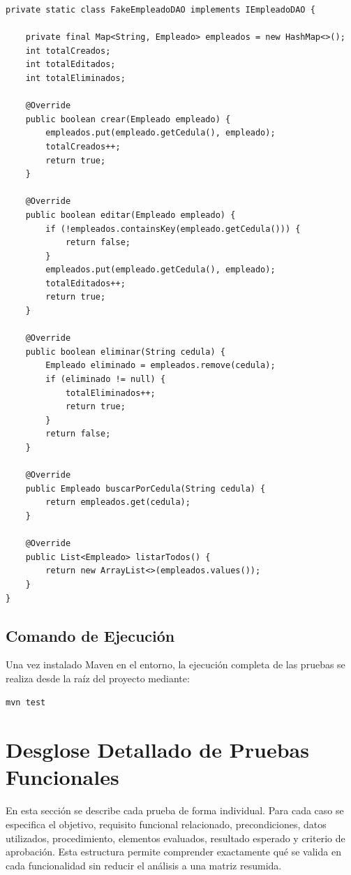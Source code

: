 \documentclass[12pt,a4paper]{article}
\begin{document}
\begin{lstlisting}[style=javaStyle, caption={DAO en memoria para empleados}]
private static class FakeEmpleadoDAO implements IEmpleadoDAO {

    private final Map<String, Empleado> empleados = new HashMap<>();
    int totalCreados;
    int totalEditados;
    int totalEliminados;

    @Override
    public boolean crear(Empleado empleado) {
        empleados.put(empleado.getCedula(), empleado);
        totalCreados++;
        return true;
    }

    @Override
    public boolean editar(Empleado empleado) {
        if (!empleados.containsKey(empleado.getCedula())) {
            return false;
        }
        empleados.put(empleado.getCedula(), empleado);
        totalEditados++;
        return true;
    }

    @Override
    public boolean eliminar(String cedula) {
        Empleado eliminado = empleados.remove(cedula);
        if (eliminado != null) {
            totalEliminados++;
            return true;
        }
        return false;
    }

    @Override
    public Empleado buscarPorCedula(String cedula) {
        return empleados.get(cedula);
    }

    @Override
    public List<Empleado> listarTodos() {
        return new ArrayList<>(empleados.values());
    }
}
\end{lstlisting}

\subsection{Comando de Ejecución}

Una vez instalado Maven en el entorno, la ejecución completa de las pruebas se realiza desde la raíz del proyecto mediante:

\begin{lstlisting}[style=javaStyle, caption={Comando para ejecutar pruebas}]
mvn test
\end{lstlisting}

\section{Desglose Detallado de Pruebas Funcionales}

En esta sección se describe cada prueba de forma individual. Para cada caso se especifica el objetivo, requisito funcional relacionado, precondiciones, datos utilizados, procedimiento, elementos evaluados, resultado esperado y criterio de aprobación. Esta estructura permite comprender exactamente qué se valida en cada funcionalidad sin reducir el análisis a una matriz resumida.
\end{document}
